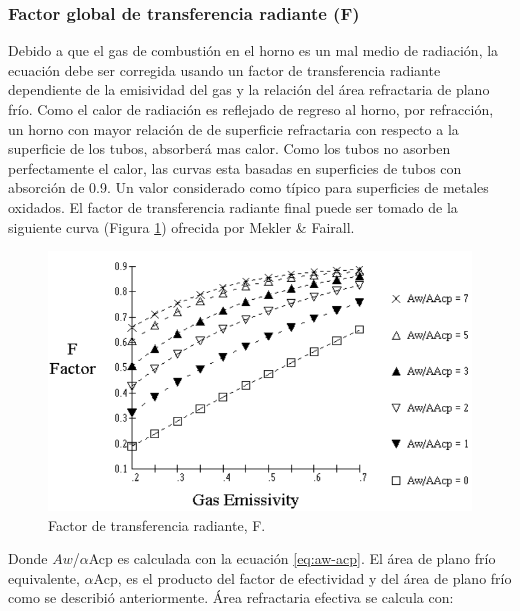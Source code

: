 \subsubsection{Factor global de transferencia radiante (F)}
\par Debido a que el gas de combustión en el horno es un mal medio de radiación, la ecuación debe ser corregida usando un factor de transferencia radiante dependiente de la emisividad del gas y la relación del área refractaria de plano frío. Como el calor de radiación es reflejado de regreso al horno, por refracción, un horno con mayor relación de de superficie refractaria con respecto a la superficie de los tubos, absorberá mas calor. Como los tubos no asorben perfectamente el calor, las curvas esta basadas en superficies de tubos con absorción de 0.9. Un valor considerado como típico para superficies de metales oxidados. El factor de transferencia radiante final puede ser tomado de la siguiente curva (Figura \ref{fig:f}) ofrecida por Mekler \& Fairall\cite{bib:mekler}.

\begin{figure}[hbt]
\begin{center}
\includegraphics[scale=0.45]{images/f}
\caption[Factor de transferencia radiante, F]{Factor de transferencia radiante, F.}
\label{fig:f}
\end{center}
\end{figure}

\par Donde $Aw$/$\alpha$Acp es calculada con la ecuación \ref{eq:aw-acp}. El área de plano frío equivalente, $\alpha$Acp, es el producto del factor de efectividad y del área de plano frío como se describió anteriormente. Área refractaria efectiva se calcula con:


